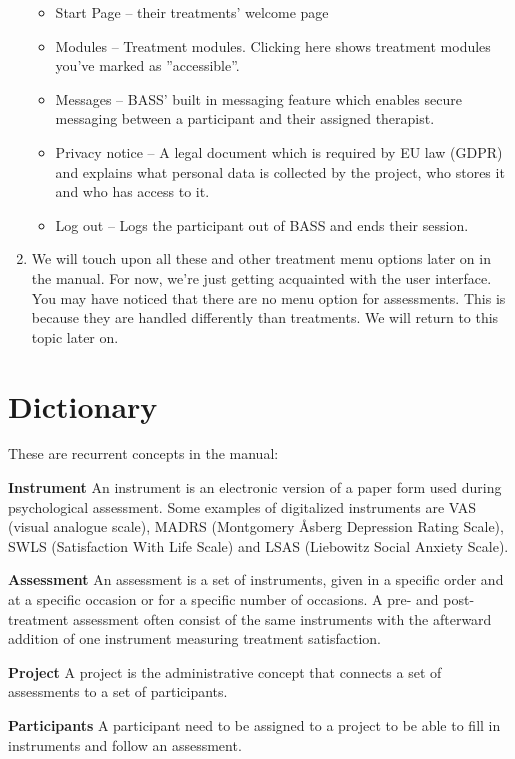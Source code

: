 \documentclass[
]{book}
\providecommand{\tightlist}{%
  \setlength{\itemsep}{0pt}\setlength{\parskip}{0pt}}
\begin{document}
\begin{enumerate}
  \begin{itemize}
  \tightlist
  \item
    Start Page -- their treatments' welcome page
  \item
    Modules -- Treatment modules. Clicking here shows treatment modules you've marked as ''accessible''.
  \item
    Messages -- BASS' built in messaging feature which enables secure messaging between a participant and their assigned therapist.
  \item
    Privacy notice -- A legal document which is required by EU law (GDPR) and explains what personal data is collected by the project, who stores it and who has access to it.
  \item
    Log out -- Logs the participant out of BASS and ends their session.
  \end{itemize}
\item
  We will touch upon all these and other treatment menu options later on in the manual. For now, we're just getting acquainted with the user interface. You may have noticed that there are no menu option for assessments. This is because they are handled differently than treatments. We will return to this topic later on.
\end{enumerate}

\chapter{Dictionary}\label{dictionary}

These are recurrent concepts in the manual:

\textbf{Instrument}
An instrument is an electronic version of a paper form used during psychological assessment. Some examples of digitalized instruments are VAS (visual analogue scale), MADRS (Montgomery Åsberg Depression Rating Scale), SWLS (Satisfaction With Life Scale) and LSAS (Liebowitz Social Anxiety Scale).

\textbf{Assessment}
An assessment is a set of instruments, given in a specific order and at a specific occasion or for a specific number of occasions. A pre- and post-treatment assessment often consist of the same instruments with the afterward addition of one instrument measuring treatment satisfaction.

\textbf{Project}
A project is the administrative concept that connects a set of assessments to a set of participants.

\textbf{Participants}
A participant need to be assigned to a project to be able to fill in instruments and follow an assessment.
\end{document}
